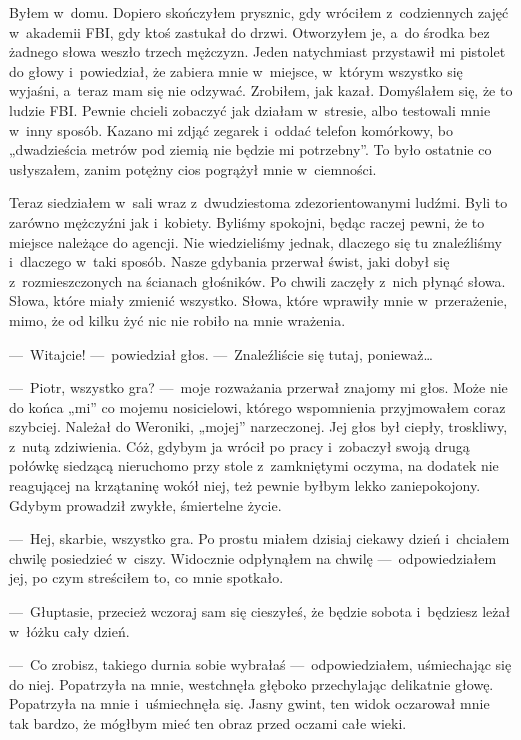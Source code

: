 Byłem w~domu. Dopiero skończyłem prysznic, gdy wróciłem z~codziennych zajęć w~akademii FBI, gdy ktoś zastukał do drzwi. Otworzyłem je, a~do środka bez żadnego słowa weszło trzech mężczyzn. Jeden natychmiast przystawił mi pistolet do głowy i~powiedział, że zabiera mnie w~miejsce, w~którym wszystko się wyjaśni, a~teraz mam się nie odzywać. Zrobiłem, jak kazał. Domyślałem się, że to ludzie FBI. Pewnie chcieli zobaczyć jak działam w~stresie, albo testowali mnie w~inny sposób. Kazano mi zdjąć zegarek i~oddać telefon komórkowy, bo „dwadzieścia metrów pod ziemią nie będzie mi potrzebny”. To było ostatnie co usłyszałem, zanim potężny cios pogrążył mnie w~ciemności.

Teraz siedziałem w~sali wraz z~dwudziestoma zdezorientowanymi ludźmi. Byli to zarówno mężczyźni jak i~kobiety. Byliśmy spokojni, będąc raczej pewni, że to miejsce należące do agencji. Nie wiedzieliśmy jednak, dlaczego się tu znaleźliśmy i~dlaczego w~taki sposób. Nasze gdybania przerwał świst, jaki dobył się z~rozmieszczonych na ścianach głośników. Po chwili zaczęły z~nich płynąć słowa. Słowa, które miały zmienić wszystko. Słowa, które wprawiły mnie w~przerażenie, mimo, że od kilku żyć nic nie robiło na mnie wrażenia.

---~Witajcie! ---~powiedział głos. ---~Znaleźliście się tutaj, ponieważ…

---~Piotr, wszystko gra? ---~moje rozważania przerwał znajomy mi głos. Może nie do końca „mi” co mojemu nosicielowi, którego wspomnienia przyjmowałem coraz szybciej. Należał do Weroniki, „mojej” narzeczonej. Jej głos był ciepły, troskliwy, z~nutą zdziwienia. Cóż, gdybym ja wrócił po pracy i~zobaczył swoją drugą połówkę siedzącą nieruchomo przy stole z~zamkniętymi oczyma, na dodatek nie reagującej na krzątaninę wokół niej, też pewnie byłbym lekko zaniepokojony. Gdybym prowadził zwykłe, śmiertelne życie.

---~Hej, skarbie, wszystko gra. Po prostu miałem dzisiaj ciekawy dzień i~chciałem chwilę posiedzieć w~ciszy. Widocznie odpłynąłem na chwilę ---~odpowiedziałem jej, po czym streściłem to, co mnie spotkało.

---~Głuptasie, przecież wczoraj sam się cieszyłeś, że będzie sobota i~będziesz leżał w~łóżku cały dzień.

---~Co zrobisz, takiego durnia sobie wybrałaś ---~odpowiedziałem, uśmiechając się do niej. Popatrzyła na mnie, westchnęła głęboko przechylając delikatnie głowę. Popatrzyła na mnie i~uśmiechnęła się. Jasny gwint, ten widok oczarował mnie tak bardzo, że mógłbym mieć ten obraz przed oczami całe wieki. 

